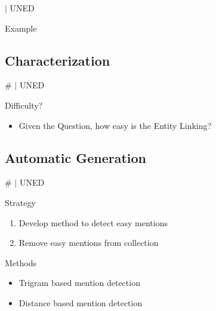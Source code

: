 \documentclass[]{beamer}
\newcommand{\mSlideTitle}{{{\color{gray}\secname}} \# \subsecname \hfill {\scriptsize$|$ UNED}}
\newcommand{\mShortTitle}{\secname \hfill {\scriptsize$|$ UNED}}
\begin{document}
  \begin{frame}[fragile]{\mShortTitle}
    \begin{alertblock}{Example}
      
    \end{alertblock}
  \end{frame}

\subsection{Characterization}
  \begin{frame}{\mSlideTitle}
    \begin{alertblock}{Difficulty?}
      \begin{itemize}
        \item Given the Question, how easy is the Entity Linking?
      \end{itemize}
      
    \end{alertblock}
  \end{frame}

\subsection{Automatic Generation}
  \begin{frame}{\mSlideTitle}
    \begin{alertblock}{Strategy}
      \begin{enumerate}
        \item Develop method to detect easy mentions
        \item Remove easy mentions from collection
      \end{enumerate}
    \end{alertblock}
    \begin{alertblock}{Methods}
      \begin{itemize}
        \item Trigram based mention detection
        \item Distance based mention detection
      \end{itemize}
    \end{alertblock}
  \end{frame}
\end{document}
